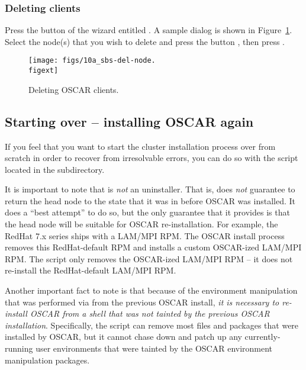 \subsubsection{Deleting clients}
\label{det:deleting-clients}

Press the button of the wizard entitled .
A sample dialog is shown in Figure~\ref{fig:detailed-delete-node}.
Select the node(s) that you wish to delete and press the button
, then press .

\begin{figure}[htbp]
  \begin{center}
    \texttt{[image: figs/10a\_sbs-del-node.\\figext]}
    \caption{Deleting OSCAR clients.}
    \label{fig:detailed-delete-node}
  \end{center}
\end{figure}


\subsection{Starting over -- installing OSCAR again}

If you feel that you want to start the cluster installation process
over from scratch in order to recover from irresolvable errors, you
can do so with the  script located in the
 subdirectory.

It is important to note that  is {\em not} an
uninstaller.  That is,  does {\em not} guarantee to
return the head node to the state that it was in before OSCAR was
installed.  It does a ``best attempt'' to do so, but the only
guarantee that it provides is that the head node will be suitable for
OSCAR re-installation.  For example, the RedHat 7.x series ships with
a LAM/MPI RPM.  The OSCAR install process removes this RedHat-default
RPM and installs a custom OSCAR-ized LAM/MPI RPM.  The
 script only removes the OSCAR-ized LAM/MPI RPM -- it
does not re-install the RedHat-default LAM/MPI RPM.

Another important fact to note is that because of the environment
manipulation that was performed via  from the previous
OSCAR install, {\em it is necessary to re-install OSCAR from a shell
  that was not tainted by the previous OSCAR installation}.
Specifically, the  script can remove most files and
packages that were installed by OSCAR, but it cannot chase down and
patch up any currently-running user environments that were tainted by
the OSCAR environment manipulation packages.

